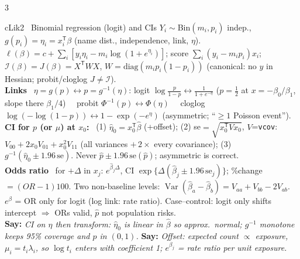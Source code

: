 \documentclass{article}
\newcommand{\h}[1]{{\bfseries #1}\ }
\newcommand{\say}[1]{{\color{cMC!75!black}\textbf{Say:}} \emph{#1}}
\newcommand{\V}{\operatorname{Var}}
\newcommand{\I}{\mathcal I}
\newcommand{\tsp}{^{\mathsf T}}
\newcommand{\rc}[1]{\texttt{#1}}
\newcommand{\sep}{\ \textbullet\ }
\begin{document}
\begin{multicols*}{3}
\begin{tb}{cLik}{2 \textbullet\ Binomial regression (logit) and CIs}
$Y_i\sim$Bin$(m_i,p_i)$ indep., $g(p_i)=\eta_i=x_i\tsp\beta$ (name dist., independence, link, $\eta$).
$\ell(\beta)=c+\sum_i[y_i\eta_i-m_i\log(1+e^{\eta_i})]$; score $\sum_i(y_i-m_ip_i)x_i$; $\I(\beta)=J(\beta)=X\tsp WX$, $W=\text{diag}(m_ip_i(1-p_i))$ (canonical: no $y$ in Hessian; probit/cloglog $J\ne\I$).\\
\h{Links} $\eta=g(p)\leftrightarrow p=g^{-1}(\eta)$: logit $\log\frac p{1-p}\leftrightarrow\frac{1}{1+e^{-\eta}}$ ($p=\frac12$ at $x=-\beta_0/\beta_1$, slope there $\beta_1/4$) \sep probit $\Phi^{-1}(p)\leftrightarrow\Phi(\eta)$ \sep cloglog $\log(-\log(1-p))\leftrightarrow1-\exp(-e^\eta)$ (asymmetric; ``$\ge1$ Poisson event'').\\
\h{CI for $p$ (or $\mu$) at $x_0$:} (1) $\hat\eta_0=x_0\tsp\hat\beta$ (+offset); (2) se$=\sqrt{x_0\tsp Vx_0}$, $V$=\rc{vcov}: $V_{00}+2x_0V_{01}+x_0^2V_{11}$ (all variances $+\,2\times$ every covariance); (3) $g^{-1}(\hat\eta_0\pm1.96\,\text{se})$. Never $\hat p\pm1.96\,\text{se}(\hat p)$; asymmetric is correct.\\
\h{Odds ratio} for $+\Delta$ in $x_j$: $e^{\hat\beta_j\Delta}$, CI $\exp\{\Delta(\hat\beta_j\pm1.96\,\text{se}_j)\}$; \%change $=(OR-1)100$. Two non-baseline levels: $\V(\hat\beta_a-\hat\beta_b)=V_{aa}+V_{bb}-2V_{ab}$. $e^\beta$ = OR only for logit (log link: rate ratio). Case--control: logit only shifts intercept $\Rightarrow$ ORs valid, $\hat p$ not population risks.\\
\say{CI on $\eta$ then transform: $\hat\eta_0$ is linear in $\hat\beta$ so approx.\ normal; $g^{-1}$ monotone keeps 95\% coverage and $p$ in $(0,1)$.}
\say{Offset: expected count $\propto$ exposure, $\mu_i=t_i\lambda_i$, so $\log t_i$ enters with coefficient 1; $e^{\beta_j}$ = rate ratio per unit exposure.}
\end{tb}


\end{multicols*}
\end{document}
